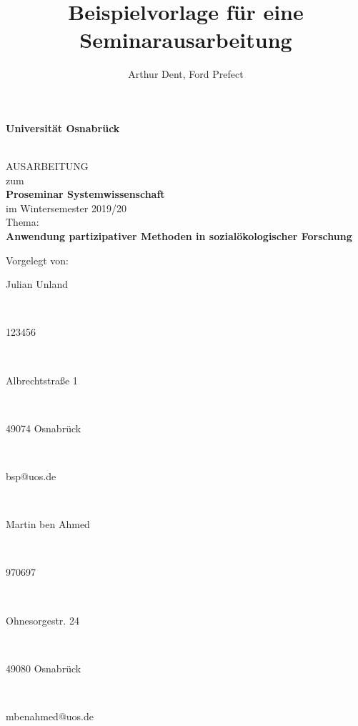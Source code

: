 \documentclass[a4paper, 11pt, DIV=11, listof=numbered, numbers=noenddot]{scrartcl}
\title{Beispielvorlage für eine Seminarausarbeitung}
\author{Arthur Dent, Ford Prefect}
\begin{document}
	
	
	\begin{titlepage}
		\begin{center}
			\vspace*{1.5cm}
			\begin{Large}
				\textbf{Universit\"at Osnabr\"uck}
			\end{Large}
			
			\noindent\hrulefill
			\\[3.5cm]
			AUSARBEITUNG \\[1cm]
			zum  \\[1cm]
			\textbf{Proseminar Systemwissenschaft} \\[1.5cm]    %
			im Wintersemester 2019/20 \\[1.5cm]   %
			Thema: \\[0.5cm]
			\textbf{Anwendung partizipativer Methoden in sozialökologischer Forschung} \\[2cm]        %
		
		\end{center}
		\vfill
		\begin{flushleft}
			Vorgelegt von: 
			\hfill \parbox{60mm}{Julian Unland} \\  %
			\hfill \parbox{60mm}{123456} \\
			\hfill \parbox{60mm}{Albrechtstraße 1} \\
			\hfill \parbox{60mm}{49074 Osnabrück} \\
			\hfill \parbox{60mm}{bsp@uos.de} \\
			\hfill \parbox{60mm}{Martin ben Ahmed} \\  %
			\hfill \parbox{60mm}{970697} \\
			\hfill \parbox{60mm}{Ohnesorgestr. 24} \\
			\hfill \parbox{60mm}{49080 Osnabrück} \\
			\hfill \parbox{60mm}{mbenahmed@uos.de}
		\end{flushleft}
	\end{titlepage}
	
	
	\newpage
	\tableofcontents 
	
	
	
\end{document}

